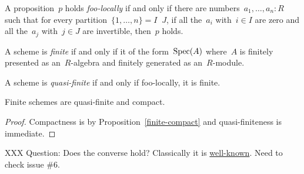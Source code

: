 \begin{definition}A proposition~$p$ holds \emph{foo-locally} if and only if
there are numbers~$a_1,\ldots,a_n : R$ such that for every
partition~$\{1,\ldots,n\} = I \mathop{\dot\cup} J$, if all the~$a_i$ with~$i
\in I$ are zero and all the~$a_j$ with~$j \in J$ are invertible, then~$p$
holds.
\end{definition}

\begin{definition}A scheme is \emph{finite} if and only if it of the
form~$\operatorname{Spec}(A)$ where~$A$ is finitely presented as an~$R$-algebra and finitely
generated as an~$R$-module.\end{definition}

\begin{definition}A scheme is \emph{quasi-finite} if and only if foo-locally,
it is finite.
\end{definition}

\begin{proposition}Finite schemes are quasi-finite and
compact.\end{proposition}

\begin{proof}Compactness is by Proposition~\ref{finite-compact} and
quasi-finiteness is immediate.
\end{proof}

XXX Question: Does the converse hold? Classically it is
\href{https://math.stackexchange.com/questions/4674878/does-quasi-finite-and-\%C3\%A9tale-locally-closed-enough-to-imply-finite}{well-known}.
Need to check issue \#6.
